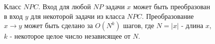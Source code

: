 \begin{figure}
\centering



\caption{Класс $NPC$. Вход для любой $NP$ задачи $x$ может быть
  преобразован в вход $y$ для некоторой задачи из класса
  $NPC$. Преобразование $x \rightarrow y$ может быть сделано за 
  $O\left(N^k\right)$ шагов, где $N = \left|x\right|$ - длина $x$, $k$
  - некоторое целое число независящее от $N$.
} 
\label{figAddAlgoNPC}
\end{figure}
